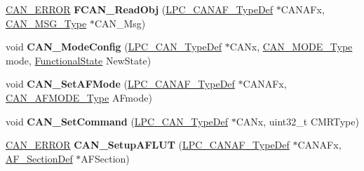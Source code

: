 \begin{DoxyCompactItemize}
\item 
\hypertarget{group___c_a_n___public___functions_ga9795c2eda618edd1a67a10937729f284}{\hyperlink{group___c_a_n___public___types_ga1d9859e6b360c9448574f86ea199a112}{\-C\-A\-N\-\_\-\-E\-R\-R\-O\-R} {\bfseries \-F\-C\-A\-N\-\_\-\-Read\-Obj} (\hyperlink{struct_l_p_c___c_a_n_a_f___type_def}{\-L\-P\-C\-\_\-\-C\-A\-N\-A\-F\-\_\-\-Type\-Def} $\ast$\-C\-A\-N\-A\-Fx, \hyperlink{struct_c_a_n___m_s_g___type}{\-C\-A\-N\-\_\-\-M\-S\-G\-\_\-\-Type} $\ast$\-C\-A\-N\-\_\-\-Msg)}\label{group___c_a_n___public___functions_ga9795c2eda618edd1a67a10937729f284}

\item 
\hypertarget{group___c_a_n___public___functions_gab58915eb635f7035bc2e6520c03789d3}{void {\bfseries \-C\-A\-N\-\_\-\-Mode\-Config} (\hyperlink{struct_l_p_c___c_a_n___type_def}{\-L\-P\-C\-\_\-\-C\-A\-N\-\_\-\-Type\-Def} $\ast$\-C\-A\-Nx, \hyperlink{group___c_a_n___public___types_ga0d26bc8676971e4fa5cc30fef59a42b9}{\-C\-A\-N\-\_\-\-M\-O\-D\-E\-\_\-\-Type} mode, \hyperlink{group___l_p_c___types___public___types_gac9a7e9a35d2513ec15c3b537aaa4fba1}{\-Functional\-State} \-New\-State)}\label{group___c_a_n___public___functions_gab58915eb635f7035bc2e6520c03789d3}

\item 
\hypertarget{group___c_a_n___public___functions_gaaeb694de5c1f601e86f583a3fb028b73}{void {\bfseries \-C\-A\-N\-\_\-\-Set\-A\-F\-Mode} (\hyperlink{struct_l_p_c___c_a_n_a_f___type_def}{\-L\-P\-C\-\_\-\-C\-A\-N\-A\-F\-\_\-\-Type\-Def} $\ast$\-C\-A\-N\-A\-Fx, \hyperlink{group___c_a_n___public___types_gafacd7b7c906689c2aaa0564ac8154d00}{\-C\-A\-N\-\_\-\-A\-F\-M\-O\-D\-E\-\_\-\-Type} \-A\-Fmode)}\label{group___c_a_n___public___functions_gaaeb694de5c1f601e86f583a3fb028b73}

\item 
\hypertarget{group___c_a_n___public___functions_ga2e4e74657b8d58fb437bec82e9cf1e9c}{void {\bfseries \-C\-A\-N\-\_\-\-Set\-Command} (\hyperlink{struct_l_p_c___c_a_n___type_def}{\-L\-P\-C\-\_\-\-C\-A\-N\-\_\-\-Type\-Def} $\ast$\-C\-A\-Nx, uint32\-\_\-t \-C\-M\-R\-Type)}\label{group___c_a_n___public___functions_ga2e4e74657b8d58fb437bec82e9cf1e9c}

\item 
\hypertarget{group___c_a_n___public___functions_ga3629103b3216a7f7bdbc3d4a06c0413b}{\hyperlink{group___c_a_n___public___types_ga1d9859e6b360c9448574f86ea199a112}{\-C\-A\-N\-\_\-\-E\-R\-R\-O\-R} {\bfseries \-C\-A\-N\-\_\-\-Setup\-A\-F\-L\-U\-T} (\hyperlink{struct_l_p_c___c_a_n_a_f___type_def}{\-L\-P\-C\-\_\-\-C\-A\-N\-A\-F\-\_\-\-Type\-Def} $\ast$\-C\-A\-N\-A\-Fx, \hyperlink{struct_a_f___section_def}{\-A\-F\-\_\-\-Section\-Def} $\ast$\-A\-F\-Section)}\label{group___c_a_n___public___functions_ga3629103b3216a7f7bdbc3d4a06c0413b}


\end{DoxyCompactItemize}
